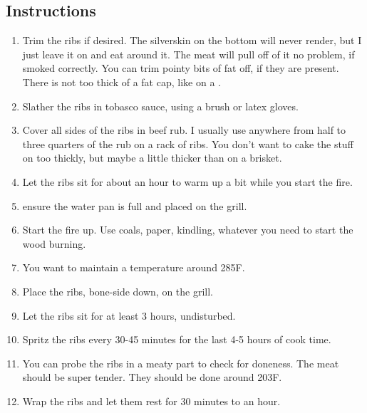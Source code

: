 \begin{multicols}{2}
\subsection*{Instructions}
\begin{enumerate}
    \item Trim the ribs if desired. The silverskin on the bottom will never render, but I just leave it on and eat around it. The meat will pull off of it no problem, if smoked correctly. You can trim pointy bits of fat off, if they are present. There is not too thick of a fat cap, like on a .
    \item Slather the ribs in tobasco sauce, using a brush or latex gloves.
    \item Cover all sides of the ribs in beef rub. I usually use anywhere from half to three quarters of the rub on a rack of ribs. You don't want to cake the stuff on too thickly, but maybe a little thicker than on a brisket.
    \item Let the ribs sit for about an hour to warm up a bit while you start the fire.
    \item ensure the water pan is full and placed on the grill.
    \item Start the fire up. Use coals, paper, kindling, whatever you need to start the wood burning.
    \item You want to maintain a temperature around 285F.
    \item Place the ribs, bone-side down, on the grill.
    \item Let the ribs sit for at least 3 hours, undisturbed.
    \item Spritz the ribs every 30-45 minutes for the last 4-5 hours of cook time.
    \item You can probe the ribs in a meaty part to check for doneness. The meat should be super tender. They should be done around 203F.
    \item Wrap the ribs and let them rest for 30 minutes to an hour.
\end{enumerate}


\end{multicols}
